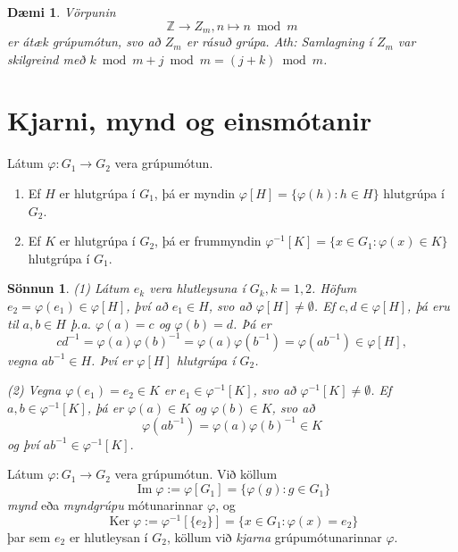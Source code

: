 \documentclass[a4paper,icelandic,11pt]{book}
\theoremstyle{plain}
\newtheorem{daemi}{Dæmi}[chapter]
\newtheorem*{sonnun}{Sönnun}
\newcommand{\Z}{\mathbb{Z}}
\DeclareMathOperator{\im}{Im} %
\DeclareMathOperator{\Ker}{Ker} %
\begin{document}
\begin{daemi}
  Vörpunin 
  \[
    \Z\to Z_m, n\mapsto n\bmod m
  \]
  er átæk grúpumótun, svo að $Z_m$ er rásuð grúpa. \emph{Ath:} Samlagning í
  $Z_m$ var skilgreind með $k\bmod m + j\bmod m = (j+k)\bmod m$.
\end{daemi}

\section{Kjarni, mynd og einsmótanir}
\begin{setn}
  Látum $\varphi: G_1\to G_2$ vera grúpumótun.
  \begin{enumerate}[(1)]
    \item Ef $H$ er hlutgrúpa í $G_1$, þá er myndin $\varphi[H] =
      \{\varphi(h):h\in H\}$ hlutgrúpa í $G_2$.
    \item Ef $K$ er hlutgrúpa í $G_2$, þá er frummyndin $\varphi^{-1}[K] =
      \{x\in G_1: \varphi(x)\in K\}$ hlutgrúpa í $G_1$.
  \end{enumerate}
\end{setn}
\begin{sonnun}
  (1) Látum $e_k$ vera hlutleysuna í $G_k, k=1,2$. Höfum $e_2 = \varphi(e_1)\in
  \varphi[H]$, því að $e_1\in H$, svo að $\varphi[H]\neq \emptyset$. Ef $c,d\in
  \varphi[H]$, þá eru til $a,b\in H$ þ.a. $\varphi(a) = c$ og $\varphi(b) = d$.
  Þá er 
  \[
    cd^{-1} 
    = \varphi(a)\varphi(b)^{-1} 
    = \varphi(a)\varphi(b^{-1}) 
    = \varphi(ab^{-1}) \in \varphi[H],
  \]
  vegna $ab^{-1}\in H$. Því er $\varphi[H]$ hlutgrúpa í $G_2$.
  
  (2) Vegna $\varphi(e_1)=e_2\in K$ er $e_1\in \varphi^{-1}[K]$, svo að
  $\varphi^{-1}[K]\neq \emptyset$. Ef $a,b\in \varphi^{-1}[K]$, þá er
  $\varphi(a)\in K$ og $\varphi(b)\in K$, svo að 
  \[
    \varphi(ab^{-1})=\varphi(a)\varphi(b)^{-1}\in K
  \]
  og því $ab^{-1}\in \varphi^{-1}[K].$
\end{sonnun}

\begin{skilgr}
  Látum $\varphi:G_1\to G_2$ vera grúpumótun. Við köllum
  \[ \im\varphi:=\varphi[G_1]=\{\varphi(g):g\in G_1\} \]
  \emph{mynd} eða
  \emph{myndgrúpu}
  mótunarinnar $\varphi$, og 
  \[
    \Ker \varphi 
    := \varphi^{-1}[\{e_2\}]
    = \{ x\in G_1 : \varphi(x) = e_2 \}
  \]
  þar sem $e_2$ er hlutleysan í $G_2$, köllum við 
  \emph{kjarna}
  grúpumótunarinnar $\varphi$.
\end{skilgr}
\end{document}
